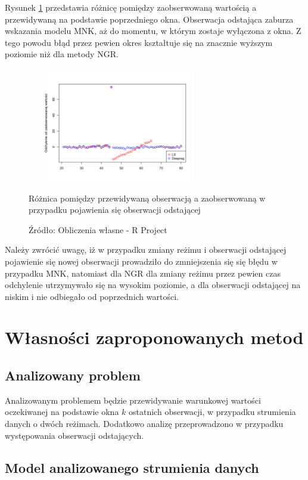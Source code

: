 \documentclass[man,mfu]{mgrwms}
\begin{document}
Rysunek \ref{fig:strepsilonout} przedstawia różnicę pomiędzy zaobserwowaną wartością a przewidywaną na podstawie poprzedniego okna. Obserwacja odstająca zaburza wskazania modelu MNK, aż do momentu, w którym zostaje wyłączona z okna. Z tego powodu błąd przez pewien okres kształtuje się na znacznie wyższym poziomie niż dla metody NGR.



\begin{figure}[h]
\centering
\vspace{-10pt}
\includegraphics[width=80mm,height = 50mm]{strepsilonout}
\caption{Różnica pomiędzy przewidywaną obserwacją a zaobserwowaną w przypadku pojawienia się obserwacji odstającej}
\caption*{Źródło: Obliczenia własne - R Project}
\label{fig:strepsilonout}
\end{figure}

Należy zwrócić uwagę, iż w przypadku zmiany reżimu i obserwacji odstającej pojawienie się nowej obserwacji prowadziło do zmniejszenia się się błędu w przypadku MNK, natomiast dla NGR dla zmiany reżimu przez pewien czas odchylenie utrzymywało się na wysokim poziomie, a dla obserwacji odstającej na niskim i nie odbiegało od poprzednich wartości.

\chapter{Własności zaproponowanych metod}

\section{Analizowany problem}

Analizowanym problemem będzie przewidywanie warunkowej wartości oczekiwanej na podstawie okna $k$ ostatnich obserwacji, w przypadku strumienia danych o dwóch reżimach. Dodatkowo analizę przeprowadzono w przypadku występowania obserwacji odstających.


\section{Model analizowanego strumienia danych}
\end{document}
